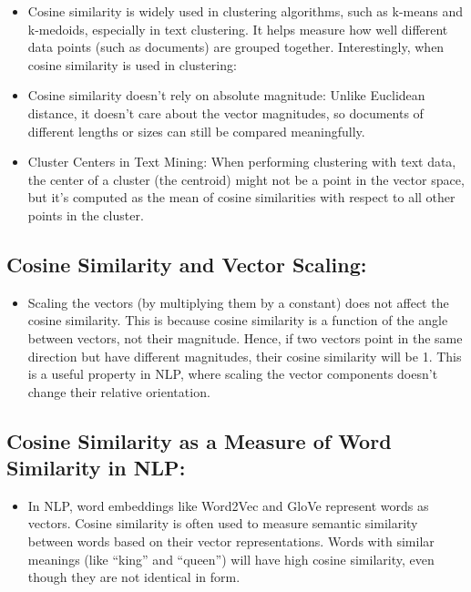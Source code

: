 \documentclass[
  12 pt,
  a4paper,
]{book}
\providecommand{\tightlist}{%
  \setlength{\itemsep}{0pt}\setlength{\parskip}{0pt}}
\numberwithin{equation}{section}
\theoremstyle{plain}      %
\theoremstyle{definition} %
\theoremstyle{remark}     %
\theoremstyle{note}         %
\begin{document}
\begin{itemize}
\tightlist
\item
  Cosine similarity is widely used in clustering algorithms, such as
  k-means and k-medoids, especially in text clustering. It helps measure
  how well different data points (such as documents) are grouped
  together. Interestingly, when cosine similarity is used in clustering:
\item
  Cosine similarity doesn't rely on absolute magnitude: Unlike Euclidean
  distance, it doesn't care about the vector magnitudes, so documents of
  different lengths or sizes can still be compared meaningfully.
\item
  Cluster Centers in Text Mining: When performing clustering with text
  data, the center of a cluster (the centroid) might not be a point in
  the vector space, but it's computed as the mean of cosine similarities
  with respect to all other points in the cluster.
\end{itemize}

\hypertarget{cosine-similarity-and-vector-scaling-1}{%
\subsection{Cosine Similarity and Vector
Scaling:}\label{cosine-similarity-and-vector-scaling-1}}

\begin{itemize}
\tightlist
\item
  Scaling the vectors (by multiplying them by a constant) does not
  affect the cosine similarity. This is because cosine similarity is a
  function of the angle between vectors, not their magnitude. Hence, if
  two vectors point in the same direction but have different magnitudes,
  their cosine similarity will be 1. This is a useful property in NLP,
  where scaling the vector components doesn't change their relative
  orientation.
\end{itemize}

\hypertarget{cosine-similarity-as-a-measure-of-word-similarity-in-nlp}{%
\subsection{Cosine Similarity as a Measure of Word Similarity in
NLP:}\label{cosine-similarity-as-a-measure-of-word-similarity-in-nlp}}

\begin{itemize}
\tightlist
\item
  In NLP, word embeddings like Word2Vec and GloVe represent words as
  vectors. Cosine similarity is often used to measure semantic
  similarity between words based on their vector representations. Words
  with similar meanings (like ``king'' and ``queen'') will have high
  cosine similarity, even though they are not identical in form.
\end{itemize}
\end{document}
